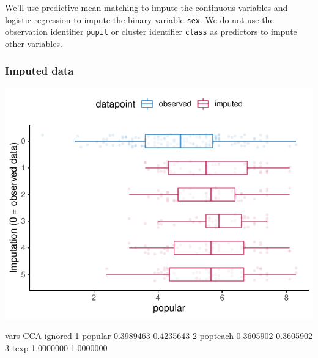 \documentclass[
]{jss}
\begin{document}
We'll use predictive mean matching to impute the continuous variables
and logistic regression to impute the binary variable \texttt{sex}. We
do not use the observation identifier \texttt{pupil} or cluster
identifier \texttt{class} as predictors to impute other variables.

\begin{CodeChunk}
\end{CodeChunk}

\hypertarget{imputed-data}{%
\subsubsection{Imputed data}\label{imputed-data}}

\begin{CodeChunk}


\begin{center}\includegraphics{Manuscript_files/figure-latex/pop_ignored_eval-1} \end{center}

\begin{CodeOutput}
      vars       CCA   ignored
1  popular 0.3989463 0.4235643
2 popteach 0.3605902 0.3605902
3     texp 1.0000000 1.0000000
\end{CodeOutput}
\end{CodeChunk}
\end{document}

